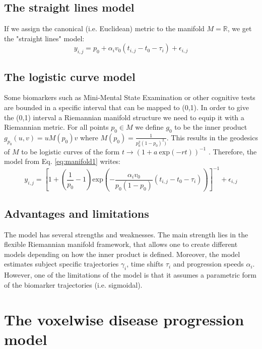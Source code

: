 \subsection{The straight lines model}

If we assign the canonical (i.e. Euclidean) metric to the manifold $M=\mathbb{R}$, we get the "straight lines" model:
\begin{equation}
 y_{i,j} = p_0 + \alpha_i v_0(t_{i,j}-t_0-\tau_i)+\epsilon_{i,j}
\end{equation}

\subsection{The logistic curve model}

Some biomarkers such as Mini-Mental State Examination or other cognitive tests are bounded in a specific interval that can be mapped to (0,1). In order to give the (0,1) interval a Riemannian manifold structure we need to equip it with a Riemannian metric. For all points $p_0 \in M$ we define $g_0$ to be the inner product $g_{p_0}(u,v) = uM(p_0)v$ where $M(p_0) = \frac{1}{p_0^2(1-p_0)^2)}$. This results in the geodesics of $M$ to be logistic curves of the form $t \rightarrow (1+a\ \text{exp}(-rt))^{-1} $ \cite{schiratti2015mixed}. Therefore, the model from Eq. \ref{eq:manifold1} writes:
\begin{equation}
 y_{i,j} = \left[ 1+\left(\frac{1}{p_0}-1\right)\text{exp}\left( -\frac{\alpha_iv_0}{p_0(1-p_0)}(t_{i,j}-t_0-\tau_i)\right) \right]^{-1}+\epsilon_{i,j}
\end{equation}

\subsection{Advantages and limitations}

The model has several strengths and weaknesses. The main strength lies in the flexible Riemannian manifold framework, that allows one to create different models depending on how the inner product is defined. Moreover, the model estimates subject specific trajectories $\gamma_i$, time shifts $\tau_i$ and progression speeds $\alpha_i$. However, one of the limitations of the model is that it assumes a parametric form of the biomarker trajectories (i.e. sigmoidal). 

\section{The voxelwise disease progression model}
\label{sec:bilgel_voxelwise}


